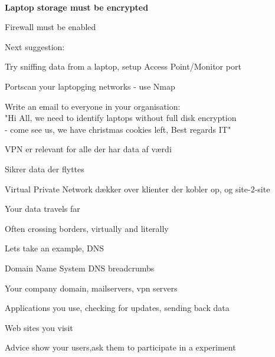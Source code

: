 \documentclass[Screen16to9,17pt]{foils}
\begin{document}
{~}
\begin{list1}
\item {\bf Laptop storage must be encrypted}
\item Firewall must be enabled
\item Next suggestion:
\begin{list2}
\item Try sniffing data from a laptop, setup Access Point/Monitor port
\item Portscan your laptopging networks - use Nmap
\item Write an email to everyone in your organisation:\\
"Hi All, we need to identify laptops without full disk encryption \\
- come see us, we have christmas cookies left, Best regards IT"
\end{list2}
\end{list1}



\begin{list2}
\item VPN er relevant for alle der har data af værdi
\item Sikrer data der flyttes
\item Virtual Private Network dækker over klienter der kobler op, og site-2-site
\end{list2}




\begin{list2}
\item Your data travels far
\item Often crossing borders, virtually and literally
\end{list2}



\begin{list1}
\item Lets take an example, DNS
\item Domain Name System DNS breadcrumbs
\begin{list2}
\item Your company domain, mailservers, vpn servers
\item Applications you use, checking for updates, sending back data
\item Web sites you visit
\end{list2}
\vskip 1cm
\item Advice show your users,ask them to participate in a experiment
\end{list1}
\end{document}
